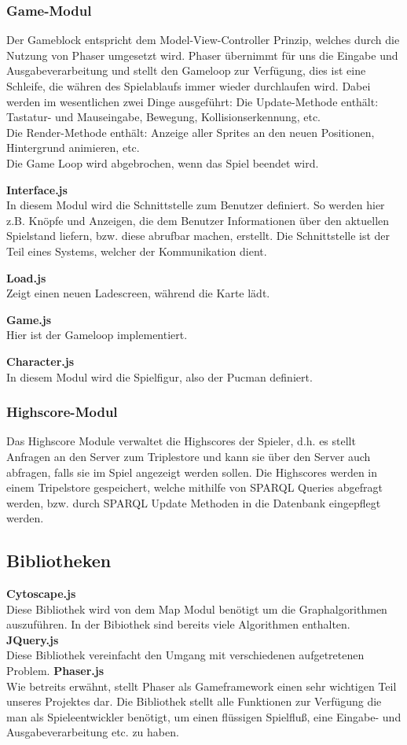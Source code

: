 \documentclass[11pt,a4paper]{article}
\begin{document}
\subsubsection{Game-Modul}
Der Gameblock entspricht dem Model-View-Controller Prinzip, welches durch die Nutzung von Phaser umgesetzt wird. 
Phaser übernimmt für uns die Eingabe und Ausgabeverarbeitung und stellt den Gameloop zur Verfügung, dies ist eine Schleife, die währen des Spielablaufs immer wieder durchlaufen wird.
Dabei werden im wesentlichen zwei Dinge ausgeführt:
Die Update-Methode enthält: Tastatur- und Mauseingabe, Bewegung, Kollisionserkennung, etc. \\
Die Render-Methode enthält: Anzeige aller Sprites an den neuen Positionen, Hintergrund animieren, etc. \\
Die Game Loop wird abgebrochen, wenn das Spiel beendet wird.
\par\bigskip
{\flushleft \textbf{Interface.js}} \\
In diesem Modul wird die Schnittstelle zum Benutzer definiert.
So werden hier z.B. Knöpfe und Anzeigen, die dem Benutzer Informationen über den aktuellen Spielstand liefern, bzw. diese abrufbar machen, erstellt.
Die Schnittstelle ist der Teil eines Systems, welcher der Kommunikation dient. \par\bigskip
{\flushleft \textbf{Load.js}} \\
Zeigt einen neuen Ladescreen, während die Karte lädt. \par\bigskip
{\flushleft \textbf{Game.js}} \\
Hier ist der Gameloop implementiert. \par\bigskip
{\flushleft\textbf{Character.js}} \\
In diesem Modul wird die Spielfigur, also der Pucman definiert.

\subsubsection{Highscore-Modul}
Das Highscore Module verwaltet die Highscores der Spieler, d.h. es stellt Anfragen an den Server zum Triplestore und kann sie über den Server auch abfragen, falls sie im Spiel angezeigt werden sollen.
Die Highscores werden in einem Tripelstore gespeichert, welche mithilfe von SPARQL Queries abgefragt werden, bzw. durch  SPARQL Update Methoden in die Datenbank eingepflegt werden.
\subsection{Bibliotheken}
{\flushleft \textbf{Cytoscape.js}} \\
Diese Bibliothek wird von dem Map Modul benötigt um die Graphalgorithmen auszuführen. In der Bibiothek sind bereits viele Algorithmen enthalten.
{\flushleft \textbf{JQuery.js}} \\
Diese Bibliothek vereinfacht den Umgang mit verschiedenen aufgetretenen Problem.
{\flushleft \textbf{Phaser.js}} \\
Wie betreits erwähnt, stellt Phaser als Gameframework einen sehr wichtigen Teil unseres Projektes dar. Die Bibliothek stellt alle Funktionen zur Verfügung die man als Spieleentwickler benötigt, um einen flüssigen Spielfluß, eine Eingabe- und Ausgabeverarbeitung etc. 
zu haben. 
\end{document}
